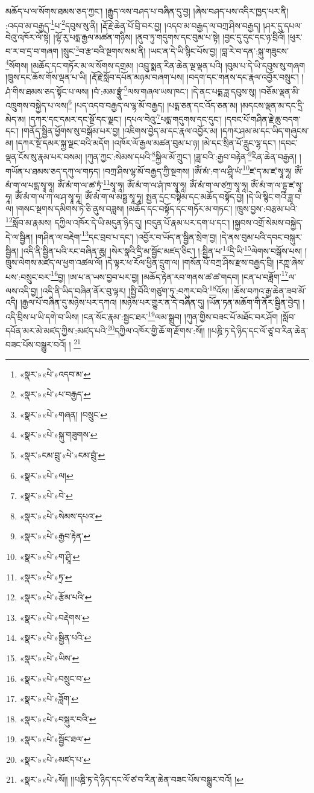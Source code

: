 མཆོད་པ་ལ་སོགས་ཐམས་ཅད་ཀྱང་། །རྒྱུད་ལས་བཤད་པ་བཞིན་དུ་བྱ། །ཞེས་བཤད་པས་འདིར་ཁྱད་པར་ནི། :འདབ་མ་བརྒྱད་\footnote{«སྣར་»«པེ་»འདབ་མ་}པ་\footnote{«སྣར་»«པེ་»པ་བརྒྱད་}དབུས་སུ་ནི། །རྡོ་རྗེ་ཆེན་པོ་བྲི་བར་བྱ། །འདབ་མ་བརྒྱད་ལ་བཀྲ་ཤིས་བརྒྱད། །ཤར་དུ་དཔལ་བེའུ་འཁོར་ལོ་སྟེ། །ལྷོ་རུ་པདྨ་རྒྱལ་མཚན་གཉིས། །ནུབ་ཏུ་གདུགས་དང་བུམ་པ་སྟེ། །བྱང་དུ་དུང་དང་ཉ་བྲིའོ། །ཕུར་བ་ར་བ་དྲ་བ་གཞག །སྲུང་\footnote{«སྣར་»«པེ་»གཞན། །བསྲུང་}བ་རྩ་བའི་སྔགས་སམ་ནི། །ཡང་ན་དེ་ཡི་སྙིང་པོས་བྱ། །བླ་རེ་བ་དན་:སྐུ་གཟུངས་\footnote{«སྣར་»«པེ་»སྐུ་གཟུགས་}སོགས། །མཆོད་དང་གཏོར་མ་ལ་སོགས་དགྲམ། །འབྲུ་སྨན་རིན་ཆེན་ལྔ་ལྡན་པའི། །བུམ་པ་དེ་ཡི་དབུས་སུ་གཞག །ཁྲུས་དང་ཆོས་གོས་ལྡན་པ་ཡི། །རྡོ་རྗེ་སློབ་དཔོན་མཉམ་བཞག་པས། །བདག་དང་གནས་དང་རྣལ་འབྱོར་བསྲུང་། །ཤཾ་གིས་ཐམས་ཅད་སྟོང་པ་ལས། །བཾ་:མམ་བྷྲཱུཾ་\footnote{«སྣར་»ངམ་བྲུ་«པེ་»ངམ་བྲུཾ་}ལས་གཞལ་ཡས་ཁང་། །དེ་ནང་པདྨ་ཟླ་དབུས་སུ། །བཅོམ་ལྡན་མི་འཁྲུགས་བསྐྱེད་པ་ལས།\footnote{«སྣར་»«པེ་»ལ།} །པད་འདབ་བརྒྱད་ལ་ལྷ་མོ་བརྒྱད། །པདྨ་ཅན་དང་འོད་ཅན་མ། །མདངས་ལྡན་མ་དང་དྲི་མེད་མ། །དཀར་དང་དམར་དང་སྔོ་དང་ལྗང་། །དཔལ་བེའུ་\footnote{«སྣར་»«པེ་»བེ་}པདྨ་གདུགས་དང་དུང་། །དབང་པོ་གཤིན་རྗེ་ཆུ་བདག་དང་། །གནོད་སྦྱིན་ཕྱོགས་སུ་བསྒོམ་པར་བྱ། །འཇིགས་བྱེད་མ་དང་རྣལ་འབྱོར་མ། །དཀར་ཤམ་མ་དང་ཡིད་གཞུངས་མ། །དཀར་སྔོ་དམར་སྐྱ་ལྗང་བའི་མདོག །འཁོར་ལོ་རྒྱལ་མཚན་བུམ་པ་ཉ། །མེ་དང་སྲིན་པོ་རླུང་ལྷ་དང་། །དབང་ལྡན་ངོས་སུ་རྣམ་པར་བསམ། །ཀུན་ཀྱང་:སེམས་དཔའི་\footnote{«སྣར་»«པེ་»སེམས་དཔའ་}སྐྱིལ་མོ་ཀྲུང་། །ཟླ་བའི་:རྒྱབ་བརྟེན་\footnote{«སྣར་»«པེ་»རྒྱབ་རྟེན་}རིན་ཆེན་བརྒྱན། །གཡོན་པ་ཐམས་ཅད་དཀུ་ལ་གཏད། །བཀྲ་ཤིས་ལྷ་མོ་བརྒྱད་ཀྱི་སྔགས། །ཨོཾ་མཾ་:ག་ལ་ཤྲཱི་ཡཾ་\footnote{«སྣར་»«པེ་»ག་ཤྲཱི་}ཛ་ད་མ་ཛ་སྭཱ་ཧཱ། ཨོཾ་མཾ་ག་ལ་པདྨ་སྭཱ་ཧཱ། ཨོཾ་མཾ་ག་ལ་ཚ་ཏྲཾ་\footnote{«སྣར་»«པེ་»ཏྲ་}སྭཱ་ཧཱ། ཨོཾ་མཾ་ག་ལ་ཤཾ་ཁ་སྭཱ་ཧཱ། ཨོཾ་མཾ་ག་ལ་ཙཀྲ་སྭཱ་ཧཱ། ཨོཾ་མཾ་ག་ལ་དྷྭ་ཛ་སྭཱ་ཧཱ། ཨོཾ་མཾ་ག་ལ་ཀ་ལ་ཤ་སྭཱ་ཧཱ། ཨོཾ་མཾ་ག་ལ་མཏྶྱ་སྭཱ་ཧཱ། སྤྱན་དྲང་བསྟིམ་དང་མཆོད་བསྟོད་བྱ། །དེ་ཡི་སྙིང་གའི་ཟླ་བ་ལ། །གསང་སྔགས་དམིགས་ཏེ་ཅི་ནུས་བཟླས། །མཆོད་དང་བསྟོད་དང་གཏོར་མ་གཏང་། །ཁྲུས་བྱས་:བརྩམ་པའི་\footnote{«སྣར་»«པེ་»རྩོམ་པའི་}སློབ་མ་རྣམས། དཀྱིལ་འཁོར་དེ་ཡི་མདུན་ཉིད་དུ། །བདུན་པོ་རྣམ་པར་དག་པ་དང་། །སྐྱབས་འགྲོ་སེམས་བསྐྱེད་དེ་ལ་སྦྱིན། །གཤིན་ལ་བརྡེག་\footnote{«སྣར་»«པེ་»བརྡེགས་}དང་བྲབ་པ་དང་། །འབྱོར་བ་ཡོད་ན་སྦྱིན་སྲེག་བྱ། །དེ་ནས་བུམ་པའི་དབང་བསྐུར་སྦྱིན། །འདི་ནི་སྦྱིན་པའི་རང་བཞིན་ཆུ། །སེར་སྣའི་དྲི་མ་སྦྱོང་མཛད་ཅིང་། །:སྦྱིན་པ་\footnote{«སྣར་»«པེ་»སྦྱིན་པའི་}དྲི་ཡི་\footnote{«སྣར་»«པེ་»ཡིས་}ལེགས་བསྒོས་པས། །
ཁྲུས་ལེགས་མཛད་ལ་ཕྱག་འཚལ་ལོ། །དེ་ལྟར་ཕ་རོལ་ཕྱིན་དྲུག་ལ། །གསོན་པོ་བཀྲ་ཤིས་རྫས་བརྒྱད་བྲི། །རཀྵ་ཞེས་པས་:བསྲུང་བར་\footnote{«སྣར་»«པེ་»བསྲུང་བ་}བྱ། །ཨ་པ་ན་ཡས་བྱབ་པར་བྱ། །མཆོད་རྟེན་རབ་གནས་ཚ་ཚ་གདབ། །ངན་པ་བཟློག་\footnote{«སྣར་»«པེ་»ཟློག་}ལ་ལས་འདི་བྱ། །འདི་ནི་ཡིད་བཞིན་ནོར་བུ་ལྟར། །སྤྱི་བོའི་གཙུག་ཏུ་:བཀུར་བའི་\footnote{«སྣར་»«པེ་»བསྐུར་བའི་}འོས། །ཆོས་བཀའ་རྒྱ་ཆེན་ཟབ་མོ་འདི། །རྒྱལ་པོ་བཞིན་དུ་མཉེས་པར་དཀའ། །མཉེས་པར་གྱུར་ན་དེ་བཞིན་དུ། །ཡོན་ཏན་མཆོག་གི་ནོར་སྦྱིན་བྱེད། །འདི་བྲིས་པ་ཡི་དགེ་བ་ཡིས། །ངན་སོང་རྣམ་:སྦྱང་ཐར་\footnote{«སྣར་»«པེ་»སྦྱོང་ཐལ་}ལམ་སྒྲུབ། །ཀུན་གྱིས་བཟང་པོ་མཐོང་བར་ཤོག །སློབ་དཔོན་མར་མེ་མཛད་ཀྱིས་:མཛད་པའི་\footnote{«སྣར་»«པེ་»མཛད་པ་}དཀྱིལ་འཁོར་གྱི་ཆོ་ག་རྫོགས་:སོ།། །།པཎྜི་ཏ་དེ་ཉིད་དང་ལོ་ཙཱ་བ་རིན་ཆེན་བཟང་པོས་བསྒྱུར་བའོ། ། \footnote{«སྣར་»«པེ་»སོ།། །།པཎྜི་ཏ་དེ་ཉིད་དང་ལོ་ཙ་བ་རིན་ཆེན་བཟང་པོས་བསྒྱུར་བའོ། ། }